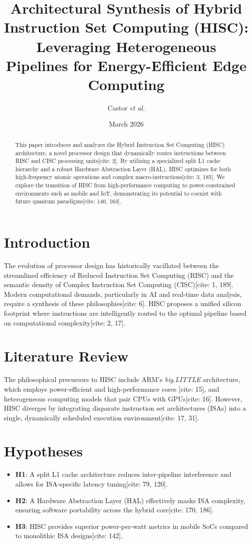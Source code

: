 \documentclass[twocolumn, 10pt]{article}
\title{\textbf{Architectural Synthesis of Hybrid Instruction Set Computing (HISC): Leveraging Heterogeneous Pipelines for Energy-Efficient Edge Computing}}
\author{Castor \textit{et al.}}
\affil{Advanced Computing Research Initiative}
\date{March 2026}
\begin{document}
\maketitle

\begin{abstract}
This paper introduces and analyzes the Hybrid Instruction Set Computing (HISC) architecture, a novel processor design that dynamically routes instructions between RISC and CISC processing units[cite: 2]. By utilizing a specialized split L1 cache hierarchy and a robust Hardware Abstraction Layer (HAL), HISC optimizes for both high-frequency atomic operations and complex macro-instructions[cite: 3, 185]. We explore the transition of HISC from high-performance computing to power-constrained environments such as mobile and IoT, demonstrating its potential to coexist with future quantum paradigms[cite: 140, 163].
\end{abstract}

\section{Introduction}
The evolution of processor design has historically vacillated between the streamlined efficiency of Reduced Instruction Set Computing (RISC) and the semantic density of Complex Instruction Set Computing (CISC)[cite: 1, 189]. Modern computational demands, particularly in AI and real-time data analysis, require a synthesis of these philosophies[cite: 6]. HISC proposes a unified silicon footprint where instructions are intelligently routed to the optimal pipeline based on computational complexity[cite: 2, 17].

\section{Literature Review}
The philosophical precursors to HISC include ARM's \textit{big.LITTLE} architecture, which employs power-efficient and high-performance cores [cite: 15], and heterogeneous computing models that pair CPUs with GPUs[cite: 16]. However, HISC diverges by integrating disparate instruction set architectures (ISAs) into a single, dynamically scheduled execution environment[cite: 17, 31].

\section{Hypotheses}
\begin{itemize}
    \item \textbf{H1}: A split L1 cache architecture reduces inter-pipeline interference and allows for ISA-specific latency tuning[cite: 79, 120].
    \item \textbf{H2}: A Hardware Abstraction Layer (HAL) effectively masks ISA complexity, ensuring software portability across the hybrid core[cite: 170, 186].
    \item \textbf{H3}: HISC provides superior power-per-watt metrics in mobile SoCs compared to monolithic ISA designs[cite: 142].
\end{itemize}
\end{document}
